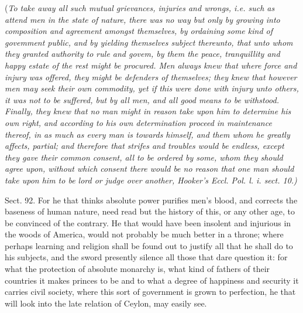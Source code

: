 \documentclass[11pt,openany]{book}
\begin{document}
(\emph{To take away all such mutual grievances, injuries and wrongs, i.e. such as attend men in the state of nature, there was no way but only by growing into composition and agreement amongst themselves, by ordaining some kind of govemment public, and by yielding themselves subject thereunto, that unto whom they granted authority to rule and govem, by them the peace, tranquillity and happy estate of the rest might be procured. Men always knew that where force and injury was offered, they might be defenders of themselves; they knew that however men may seek their own commodity, yet if this were done with injury unto others, it was not to be suffered, but by all men, and all good means to be withstood. Finally, they knew that no man might in reason take upon him to determine his own right, and according to his own determination proceed in maintenance thereof, in as much as every man is towards himself, and them whom he greatly affects, partial; and therefore that strifes and troubles would be endless, except they gave their common consent, all to be ordered by some, whom they should agree upon, without which consent there would be no reason that one man should take upon him to be lord or judge over another, Hooker's Eccl. Pol. l. i. sect. 10.)}

Sect. 92. For he that thinks absolute power purifies men's blood, and corrects the baseness of human nature, need read but the history of this, or any other age, to be convinced of the contrary. He that would have been insolent and injurious in the woods of America, would not probably be much better in a throne; where perhaps learning and religion shall be found out to justify all that he shall do to his subjects, and the sword presently silence all those that dare question it: for what the protection of absolute monarchy is, what kind of fathers of their countries it makes princes to be and to what a degree of happiness and security it carries civil society, where this sort of government is grown to perfection, he that will look into the late relation of Ceylon, may easily see.
\end{document}
